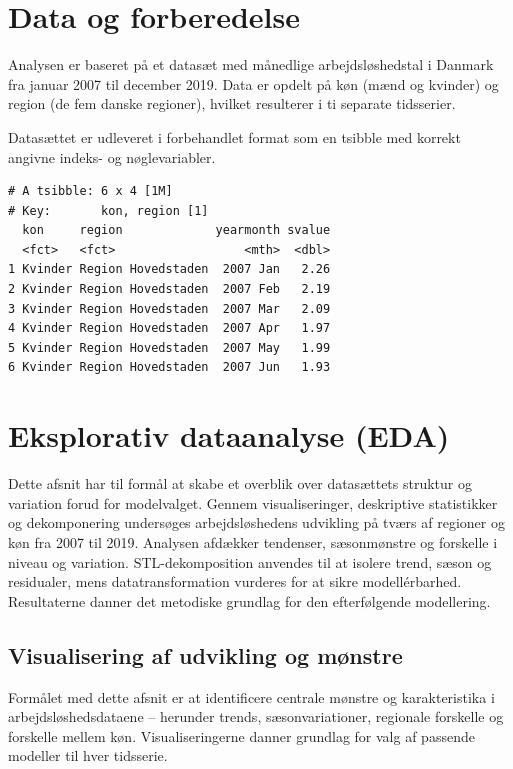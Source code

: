 \documentclass[
]{article}
\begin{document}
\section{Data og forberedelse}\label{data-og-forberedelse}

Analysen er baseret på et datasæt med månedlige arbejdsløshedstal i
Danmark fra januar 2007 til december 2019. Data er opdelt på køn (mænd
og kvinder) og region (de fem danske regioner), hvilket resulterer i ti
separate tidsserier.

Datasættet er udleveret i forbehandlet format som en tsibble med korrekt
angivne indeks- og nøglevariabler.

\begin{verbatim}
# A tsibble: 6 x 4 [1M]
# Key:       kon, region [1]
  kon     region             yearmonth svalue
  <fct>   <fct>                  <mth>  <dbl>
1 Kvinder Region Hovedstaden  2007 Jan   2.26
2 Kvinder Region Hovedstaden  2007 Feb   2.19
3 Kvinder Region Hovedstaden  2007 Mar   2.09
4 Kvinder Region Hovedstaden  2007 Apr   1.97
5 Kvinder Region Hovedstaden  2007 May   1.99
6 Kvinder Region Hovedstaden  2007 Jun   1.93
\end{verbatim}

\section{Eksplorativ dataanalyse
(EDA)}\label{eksplorativ-dataanalyse-eda}

Dette afsnit har til formål at skabe et overblik over datasættets
struktur og variation forud for modelvalget. Gennem visualiseringer,
deskriptive statistikker og dekomponering undersøges arbejdsløshedens
udvikling på tværs af regioner og køn fra 2007 til 2019. Analysen
afdækker tendenser, sæsonmønstre og forskelle i niveau og variation.
STL-dekomposition anvendes til at isolere trend, sæson og residualer,
mens datatransformation vurderes for at sikre modellérbarhed.
Resultaterne danner det metodiske grundlag for den efterfølgende
modellering.

\subsection{Visualisering af udvikling og
mønstre}\label{visualisering-af-udvikling-og-muxf8nstre}

Formålet med dette afsnit er at identificere centrale mønstre og
karakteristika i arbejdsløshedsdataene -- herunder trends,
sæsonvariationer, regionale forskelle og forskelle mellem køn.
Visualiseringerne danner grundlag for valg af passende modeller til hver
tidsserie.
\end{document}
